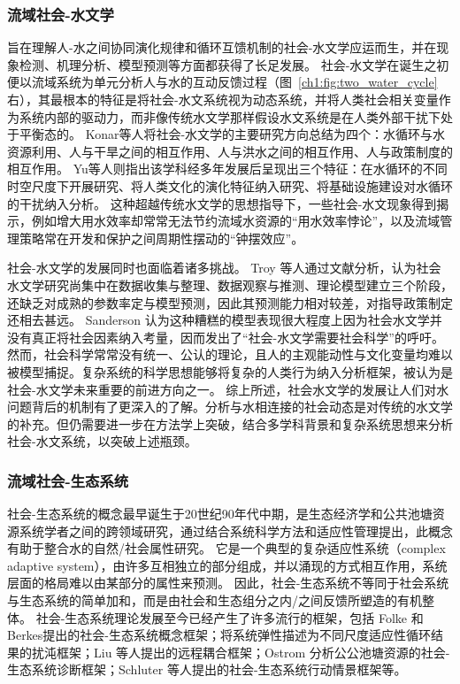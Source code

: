 \subsubsection*{流域社会-水文学}

旨在理解人-水之间协同演化规律和循环互馈机制的社会-水文学应运而生，并在现象检测、机理分析、模型预测等方面都获得了长足发展\cite{sivapalan2012, blair2016, srinivasan2016}。
社会-水文学在诞生之初便以流域系统为单元分析人与水的互动反馈过程（图~\ref{ch1:fig:two_water_cycle}右），其最根本的特征是将社会-水文系统视为动态系统，并将人类社会相关变量作为系统内部的驱动力，而非像传统水文学那样假设水文系统是在人类外部干扰下处于平衡态的\cite{sivapalan2012}。
Konar等人将社会-水文学的主要研究方向总结为四个：水循环与水资源利用、人与干旱之间的相互作用、人与洪水之间的相互作用、人与政策制度的相互作用\cite{konar2019}。
Yu等人则指出该学科经多年发展后呈现出三个特征：在水循环的不同时空尺度下开展研究、将人类文化的演化特征纳入研究、将基础设施建设对水循环的干扰纳入分析\cite{yu2020}。
这种超越传统水文学的思想指导下，一些社会-水文现象得到揭示，例如增大用水效率却常常无法节约流域水资源的“用水效率悖论”\cite{grafton2018, xiong2021a}，以及流域管理策略常在开发和保护之间周期性摆动的“钟摆效应”\cite{kandasamy2014, roobavannan2017, mostert2018}。

社会-水文学的发展同时也面临着诸多挑战。
Troy 等人通过文献分析，认为社会水文学研究尚集中在数据收集与整理、数据观察与推测、理论模型建立三个阶段，还缺乏对成熟的参数率定与模型预测，因此其预测能力相对较差，对指导政策制定还相去甚远\cite{troy2015}。
Sanderson 认为这种糟糕的模型表现很大程度上因为社会水文学并没有真正将社会因素纳入考量，因而发出了“社会-水文学需要社会科学”的呼吁\cite{sanderson2017}。
然而，社会科学常常没有统一、公认的理论，且人的主观能动性与文化变量均难以被模型捕捉。复杂系统的科学思想能够将复杂的人类行为纳入分析框架，被认为是社会-水文学未来重要的前进方向之一\cite{ahlstrom2021}。
综上所述，社会水文学的发展让人们对水问题背后的机制有了更深入的了解。分析与水相连接的社会动态是对传统的水文学的补充。但仍需要进一步在方法学上突破，结合多学科背景和复杂系统思想来分析社会-水文系统，以突破上述瓶颈。


\subsubsection*{流域社会-生态系统}

社会-生态系统的概念最早诞生于20世纪90年代中期，是生态经济学和公共池塘资源系统学者之间的跨领域研究，通过结合系统科学方法和适应性管理提出\cite{biggs2021}，此概念有助于整合水的自然/社会属性研究\cite{fowler2022}。
它是一个典型的复杂适应性系统（complex adaptive system），由许多互相独立的部分组成，并以涌现的方式相互作用，系统层面的格局难以由某部分的属性来预测\cite{schluter2019}。
因此，社会-生态系统不等同于社会系统与生态系统的简单加和，而是由社会和生态组分之内/之间反馈所塑造的有机整体\cite{biggs2021}。
社会-生态系统理论发展至今已经产生了许多流行的框架，包括 Folke 和 Berkes提出的社会-生态系统概念框架\cite{berkes2008}；将系统弹性描述为不同尺度适应性循环结果的扰沌框架\cite{gunderson2001}；Liu 等人提出的远程耦合框架\cite{liu2018}；Ostrom 分析公公池塘资源的社会-生态系统诊断框架\cite{ostrom2009}；Schluter 等人提出的社会-生态系统行动情景框架等\cite{schluter2019}。

